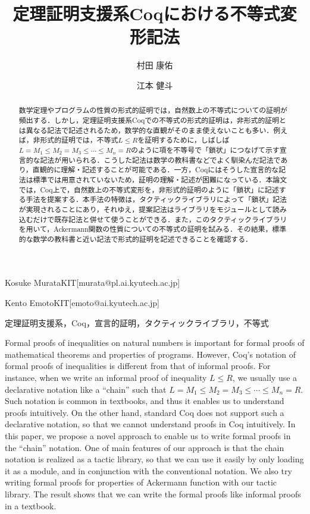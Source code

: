 \documentclass[submit]{ipsj}
\begin{document}
\title{定理証明支援系Coqにおける不等式変形記法}



\author{村田 康佑}{Kosuke Murata}{KIT}[murata@pl.ai.kyutech.ac.jp]
\author{江本 健斗}{Kento Emoto}{KIT}[emoto@ai.kyutech.ac.jp]

\begin{abstract}
数学定理やプログラムの性質の形式的証明では，自然数上の不等式についての証明が頻出する．しかし，定理証明支援系Coqでの不等式の形式的証明は，非形式的証明とは異なる記法で記述されるため，数学的な直観がそのまま使えないことも多い．例えば，非形式的証明では，不等式$L \leq R$を証明するために，しばしば$L = M_1 \leq M_2 = M_3 \leq \cdots \leq M_n = R$のように項を不等号で「鎖状」につなげて示す宣言的な記法が用いられる．こうした記法は数学の教科書などでよく馴染んだ記法であり，直観的に理解・記述することが可能である．一方，Coqにはそうした宣言的な記法は標準では用意されていないため，証明の理解・記述が困難になっている．本論文では，Coq上で，自然数上の不等式変形を，非形式的証明のように「鎖状」に記述する手法を提案する．本手法の特徴は，タクティックライブラリによって「鎖状」記法が実現されることにあり，それゆえ，提案記法はライブラリをモジュールとして読み込むだけで既存記法と併せて使うことができる．また，このタクティックライブラリを用いて，Ackermann関数の性質についての不等式の証明を試みる．その結果，標準的な数学の教科書と近い記法で形式的証明を記述できることを確認する．
\end{abstract}


\begin{jkeyword}
定理証明支援系，Coq，宣言的証明，タクティックライブラリ，不等式
\end{jkeyword}


\begin{eabstract}
Formal proofs of inequalities on natural numbers is important for formal proofs of mathematical theorems and properties of programs. However,  Coq's notation of formal proofs of inequalities is different from that of informal proofs. For instance, when we write an informal proof of inequality $L \leq R$, we usually use a declarative notation like a ``chain'' such that $L = M_1 \leq M_2 = M_3 \leq \cdots \leq M_n = R$. Such notation is common in textbooks, and thus it enables us to understand proofs intuitively. On the other hand, standard Coq does not support such a declarative notation, so that we cannot understand proofs in Coq intuitively. In this paper, we propose a novel approach to enable us to write formal proofs in the ``chain'' notation. One of main features of our approach is that the chain notation is realized as a tactic library, so that we can use it easily by only loading it as a module, and in conjunction with the conventional notation. We also try writing formal proofs for properties of Ackermann function with our tactic library. The result shows that we can write the formal proofs like informal proofs in a textbook.
\end{eabstract}
\end{document}
